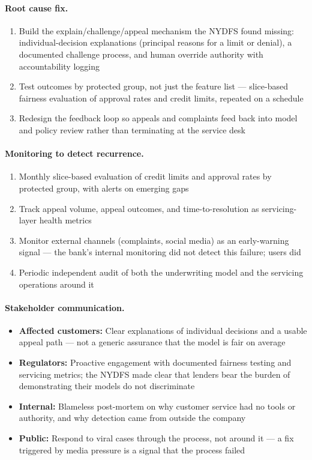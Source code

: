 \paragraph{Root cause fix.}

\begin{enumerate}
    \item Build the explain/challenge/appeal mechanism the NYDFS found missing: individual-decision explanations (principal reasons for a limit or denial), a documented challenge process, and human override authority with accountability logging
    \item Test outcomes by protected group, not just the feature list --- slice-based fairness evaluation of approval rates and credit limits, repeated on a schedule
    \item Redesign the feedback loop so appeals and complaints feed back into model and policy review rather than terminating at the service desk
\end{enumerate}

\paragraph{Monitoring to detect recurrence.}

\begin{enumerate}
    \item Monthly slice-based evaluation of credit limits and approval rates by protected group, with alerts on emerging gaps
    \item Track appeal volume, appeal outcomes, and time-to-resolution as servicing-layer health metrics
    \item Monitor external channels (complaints, social media) as an early-warning signal --- the bank's internal monitoring did not detect this failure; users did
    \item Periodic independent audit of both the underwriting model and the servicing operations around it
\end{enumerate}

\paragraph{Stakeholder communication.}

\begin{itemize}
    \item \textbf{Affected customers:} Clear explanations of individual decisions and a usable appeal path --- not a generic assurance that the model is fair on average
    \item \textbf{Regulators:} Proactive engagement with documented fairness testing and servicing metrics; the NYDFS made clear that lenders bear the burden of demonstrating their models do not discriminate
    \item \textbf{Internal:} Blameless post-mortem on why customer service had no tools or authority, and why detection came from outside the company
    \item \textbf{Public:} Respond to viral cases through the process, not around it --- a fix triggered by media pressure is a signal that the process failed
\end{itemize}

